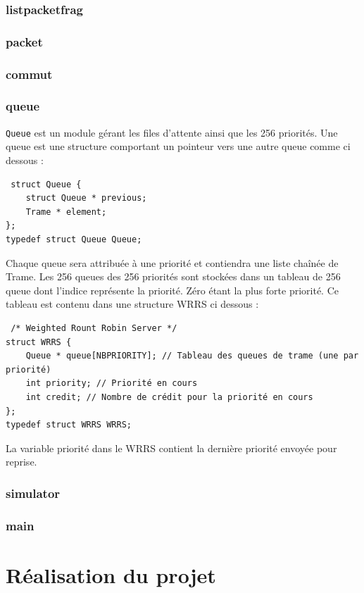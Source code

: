 \documentclass[a4paper,11pt]{article}
\begin{document}
\subsubsection{listpacketfrag}

\subsubsection{packet}

\subsubsection{commut}

\subsubsection{queue}
\texttt{Queue} est un module gérant les files d'attente ainsi que les 256 priorités. Une queue est une structure comportant un pointeur vers une autre queue comme ci dessous :
\begin{verbatim}
 struct Queue {
    struct Queue * previous;
    Trame * element;
};
typedef struct Queue Queue;
\end{verbatim}
Chaque queue sera attribuée à une priorité et contiendra une liste chaînée de Trame. Les 256 queues des 256 priorités sont stockées dans un tableau de 256 queue dont l'indice représente la priorité. Zéro étant la plus forte priorité. Ce tableau est contenu dans une structure WRRS ci dessous :
\begin{verbatim}
 /* Weighted Rount Robin Server */
struct WRRS {
    Queue * queue[NBPRIORITY]; // Tableau des queues de trame (une par priorité)
    int priority; // Priorité en cours
    int credit; // Nombre de crédit pour la priorité en cours
};
typedef struct WRRS WRRS;
\end{verbatim}
La variable priorité dans le WRRS contient la dernière priorité envoyée pour reprise.

\subsubsection{simulator}

\subsubsection{main}

\section{Réalisation du projet}
\end{document}
